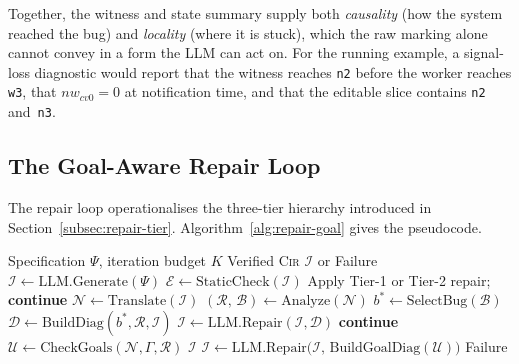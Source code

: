\medskip
\noindent
Together, the witness and state summary supply both \emph{causality}
(how the system reached the bug) and \emph{locality} (where it is
stuck), which the raw marking alone cannot convey in a form the LLM
can act on.
For the running example, a signal-loss diagnostic would report that
the witness reaches \texttt{n2} before the worker reaches \texttt{w3},
that $nw_{\mathit{cv0}}=0$ at notification time, and that the editable
slice contains \texttt{n2} and~\texttt{n3}.

\subsection{The Goal-Aware Repair Loop}
\label{subsec:repair-loop-final}
The repair loop operationalises the three-tier hierarchy introduced in
Section~\ref{subsec:repair-tier}.
Algorithm~\ref{alg:repair-goal} gives the pseudocode.

\begin{algorithm}[t]
\caption{Goal-Aware Generate--Verify--Repair Loop}
\label{alg:repair-goal}
\begin{algorithmic}[1]
\Require Specification $\Psi$, iteration budget $K$
\Ensure  Verified \textsc{Cir} $\mathcal{I}$ or Failure
\State $\mathcal{I} \gets \text{LLM.Generate}(\Psi)$
    \State $\mathcal{E} \gets \text{StaticCheck}(\mathcal{I})$
        \State Apply Tier-1 or Tier-2 repair;\;
          \textbf{continue}
    \EndIf
    \State $\mathcal{N} \gets \text{Translate}(\mathcal{I})$
    \State $(\mathcal{R},\,\mathcal{B})
      \gets \text{Analyze}(\mathcal{N})$
        \State $b^{*} \gets \text{SelectBug}(\mathcal{B})$
        \State $\mathcal{D} \gets
          \text{BuildDiag}(b^{*},\mathcal{R},\mathcal{I})$
        \State $\mathcal{I} \gets
          \text{LLM.Repair}(\mathcal{I},\mathcal{D})$
        \State \textbf{continue}
    \EndIf
    \State $\mathcal{U} \gets
      \text{CheckGoals}(\mathcal{N},\Gamma,\mathcal{R})$
        \Return $\mathcal{I}$
    \EndIf
    \State $\mathcal{I} \gets
      \text{LLM.Repair}\bigl(\mathcal{I},\,
        \text{BuildGoalDiag}(\mathcal{U})\bigr)$
\EndFor
\State \Return Failure
\end{algorithmic}
\end{algorithm}

